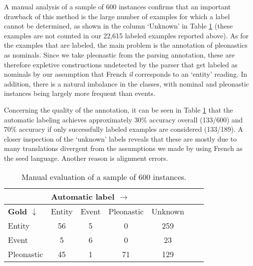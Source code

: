 \documentclass[10pt, a4paper]{article}
\begin{document}
A manual analysis of a sample of 600 instances confirms that an important drawback of  
this method is the large number of examples for which a label cannot be determined, 
as shown in the column `Unknown' in Table \ref{tab:manualsample600} (these examples are not counted in our 22,615 labeled examples reported above). 
As for the examples that are labeled, the main 
problem is the annotation of pleonastics as nominals. Since we take pleonastic 
from the parsing annotation, these are therefore expletive constructions undetected by the parser that get labeled as nominals by our assumption that French \textit{il} corresponds to an `entity' reading. In addition, 
there is a natural imbalance in the classes, with 
nominal and pleonastic instances being largely more frequent than events.  

Concerning the quality of the annotation, it can
be seen in Table \ref{tab:manualsample600} that the automatic labeling achieves 
approximately 30\% accuracy overall (133/600) and 70\% accuracy if only successfully labeled  
examples are considered (133/189). A closer 
inspection of the `unknown' labels reveals that these are mostly due to many 
translations divergent from the assumptions we made by using French as the seed 
language. Another reason is alignment errors. 


\begin{table}[h!]\centering 
\begin{tabular}{p{1.3cm}|cccccc} 
&\multicolumn{4}{l}{\textbf{Automatic label $\rightarrow$}}\\
\toprule 
{\textbf{Gold $\downarrow$}}&Entity & Event &Pleonastic & Unknown \\ 
\midrule Entity &   56  &  5   &   0     &  259  \\ 
Event &    5  &  6   &  0  &  23\\ 
Pleonastic& 45 & 1&  71&  129\\
\bottomrule 
\end{tabular} \caption{Manual evaluation of a sample of 600
instances.}\label{tab:manualsample600} 
\end{table}

%
%
%
%
\end{document}
